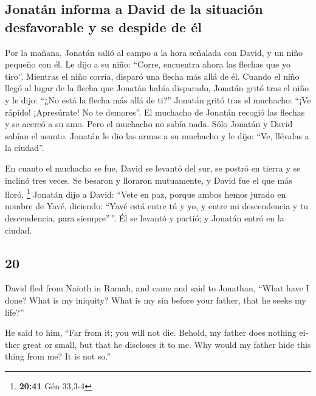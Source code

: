 \begin{paracol}{2}
\hypertarget{jonatuxe1n-informa-a-david-de-la-situaciuxf3n-desfavorable-y-se-despide-de-uxe9l}{%
\subsection{Jonatán informa a David de la situación desfavorable y se
despide de
él}\label{jonatuxe1n-informa-a-david-de-la-situaciuxf3n-desfavorable-y-se-despide-de-uxe9l}}

 Por la mañana, Jonatán salió al campo a la hora señalada
con David, y un niño pequeño con él.  Le dijo a su niño:
``Corre, encuentra ahora las flechas que yo tiro''. Mientras el niño
corría, disparó una flecha más allá de él.  Cuando el
niño llegó al lugar de la flecha que Jonatán había disparado, Jonatán
gritó tras el niño y le dijo: ``¿No está la flecha más allá de ti?''
 Jonatán gritó tras el muchacho: ``¡Ve rápido!
¡Apresúrate! No te demores''. El muchacho de Jonatán recogió las flechas
y se acercó a su amo.  Pero el muchacho no sabía nada.
Sólo Jonatán y David sabían el asunto.  Jonatán le dio
las armas a su muchacho y le dijo: ``Ve, llévalas a la ciudad''.

 En cuanto el muchacho se fue, David se levantó del sur,
se postró en tierra y se inclinó tres veces. Se besaron y lloraron
mutuamente, y David fue el que más lloró. \footnote{\textbf{20:41} Gén
  33,3-4}  Jonatán dijo a David: ``Vete en paz, porque
ambos hemos jurado en nombre de Yavé, diciendo: ``Yavé está entre tú y
yo, y entre mi descendencia y tu descendencia, para siempre''\,''. Él se
levantó y partió; y Jonatán entró en la ciudad.

\switchcolumn
\begin{otherlanguage}{english}

\hypertarget{section-39}{%
\section{20}\label{section-39}}

 David fled from Naioth in Ramah, and came and said to
Jonathan, ``What have I done? What is my iniquity? What is my sin before
your father, that he seeks my life?''

 He said to him, ``Far from it; you will not die. Behold,
my father does nothing either great or small, but that he discloses it
to me. Why would my father hide this thing from me? It is not so.''


\end{otherlanguage}
\end{paracol}
